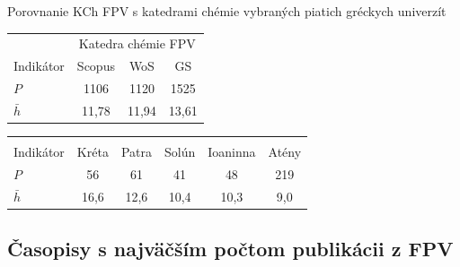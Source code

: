 \documentclass{beamer}
\begin{document}
%
%
\begin{frame}{Porovnanie KCh FPV s katedrami chémie vybraných piatich gréckych univerzít}
  \begin{table}
    \footnotesize
    \begin{tabular}{lccc}
    \toprule
    & \multicolumn{3}{c}{Katedra chémie FPV} \\
    \cmidrule{2-4}
    Indikátor & Scopus & WoS & GS \\
    \midrule
    $P$        & 1106   & 1120  & 1525  \\
    $\bar{h}$  & 11,78  & 11,94 & 13,61 \\
    \bottomrule
    \end{tabular}
  \end{table}
  \begin{table}
    \footnotesize
    \begin{tabular}{lccccc}
    \toprule
    & \multicolumn{5}{c}{\citet{Lazaridis2010}} \\
    \cmidrule{2-6}
    Indikátor & Kréta & Patra & Solún & Ioaninna & Atény \\
    \midrule
    $P$        & 56    & 61    & 41    & 48       & 219   \\
    $\bar{h}$  & 16,6  & 12,6  & 10,4  & 10,3     & 9,0   \\
    \bottomrule
    \end{tabular}
  \end{table}
\end{frame}

\subsection{Časopisy s najväčším počtom publikácii z FPV}
\end{document}
